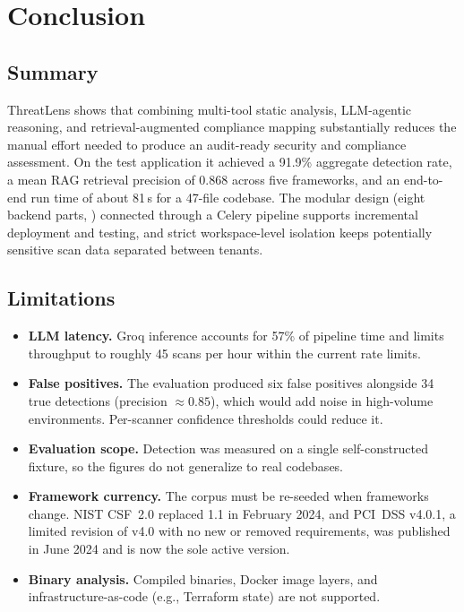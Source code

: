\documentclass[conference]{IEEEtran}
\begin{document}
\section{Conclusion}
\label{sec:conclusion}

\subsection{Summary}
ThreatLens shows that combining multi-tool static analysis, LLM-agentic
reasoning, and retrieval-augmented compliance mapping substantially reduces the
manual effort needed to produce an audit-ready security and compliance
assessment. On the test application it achieved a 91.9\% aggregate detection
rate, a mean RAG retrieval precision of 0.868 across five frameworks, and an
end-to-end run time of about 81\,s for a 47-file codebase. The modular design
(eight backend parts, ) connected through a Celery
pipeline supports incremental deployment and testing, and strict workspace-level
isolation keeps potentially sensitive scan data separated between tenants.

\subsection{Limitations}
\begin{itemize}[leftmargin=*,nosep]
  \item \textbf{LLM latency.} Groq inference accounts for 57\% of pipeline time
  and limits throughput to roughly 45 scans per hour within the current rate
  limits.
  \item \textbf{False positives.} The evaluation produced six false positives
  alongside 34 true detections (precision $\approx 0.85$), which would add noise
  in high-volume environments. Per-scanner confidence thresholds could reduce it.
  \item \textbf{Evaluation scope.} Detection was measured on a single
  self-constructed fixture, so the figures do not generalize to real codebases.
  \item \textbf{Framework currency.} The corpus must be re-seeded when
  frameworks change. NIST CSF~2.0 replaced 1.1 in February 2024, and PCI~DSS
  v4.0.1, a limited revision of v4.0 with no new or removed requirements, was
  published in June 2024 and is now the sole active version.
  \item \textbf{Binary analysis.} Compiled binaries, Docker image layers, and
  infrastructure-as-code (e.g., Terraform state) are not supported.
\end{itemize}
\end{document}
